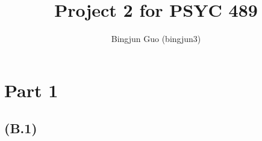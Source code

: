 \documentclass{article}
\title{Project 2 for PSYC 489}
\author{Bingjun Guo (bingjun3)}
\begin{document}
\maketitle
\section*{Part 1}
\subsection*{(B.1)}
\end{document}
